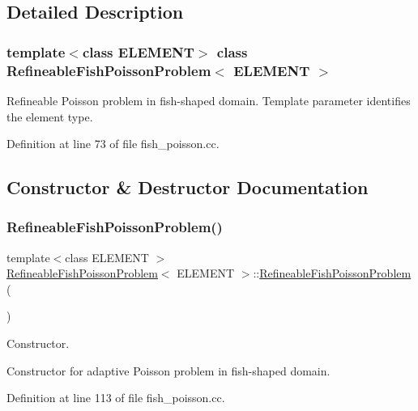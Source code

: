 \subsection{Detailed Description}
\subsubsection*{template$<$class E\+L\+E\+M\+E\+NT$>$\newline
class Refineable\+Fish\+Poisson\+Problem$<$ E\+L\+E\+M\+E\+N\+T $>$}

Refineable Poisson problem in fish-\/shaped domain. Template parameter identifies the element type. 

Definition at line 73 of file fish\+\_\+poisson.\+cc.



\subsection{Constructor \& Destructor Documentation}
\mbox{\label{classRefineableFishPoissonProblem_a7a9c8258a867de6b3c8b9d00a7c965f1}} 
\subsubsection{\texorpdfstring{Refineable\+Fish\+Poisson\+Problem()}{RefineableFishPoissonProblem()}}
{\footnotesize\ttfamily template$<$class E\+L\+E\+M\+E\+NT $>$ \\
\hyperlink{classRefineableFishPoissonProblem}{Refineable\+Fish\+Poisson\+Problem}$<$ E\+L\+E\+M\+E\+NT $>$\+::\hyperlink{classRefineableFishPoissonProblem}{Refineable\+Fish\+Poisson\+Problem} (\begin{DoxyParamCaption}{ }\end{DoxyParamCaption})}



Constructor. 

Constructor for adaptive Poisson problem in fish-\/shaped domain. 

Definition at line 113 of file fish\+\_\+poisson.\+cc.



